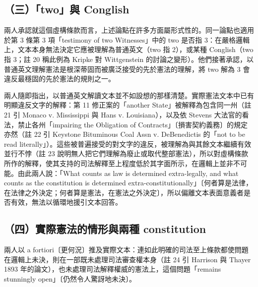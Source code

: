 \subsection{（三）「two」與 Conglish}

兩人承認就這個虛構條款而言，上述論點在許多方面屬形式性的。同一論點也適用於第 3 條第 3 項「testimony of two Witnesses」中的 two 是否指 3：在嚴格邏輯上，文本本身無法決定它應被理解為普通英文（two 指 2），或某種 Conglish（two 指 3；註 20 稱此例為 Kripke 對 Wittgenstein 的討論之變形）。他們接著承認，以普通英文理解憲法是根深蒂固而被廣泛接受的先於憲法的理解，將 two 解為 3 會違反最穩固的先於憲法的規則之一。

兩人隨即指出，以普通英文解讀文本並不如設想的那樣清楚。實際憲法文本中已有明顯違反文字的解釋：第 11 修正案的「another State」被解釋為包含同一州（註 21 引 Monaco v. Mississippi 與 Hans v. Louisiana），以及依 Stevens 大法官的看法，禁止各州「impairing the Obligation of Contracts」〔損害契約義務〕的規定亦然（註 22 引 Keystone Bituminous Coal Ass\textquotesingle n v. DeBenedictis 的「not to be read literally」）。這些被普遍接受的對文字的違反，被理解為與其餘文本繼續有效並行不悖（註 23 說明無人把它們理解為廢止或取代整部憲法），所以對虛構條款所作的解釋，使其支持的司法解釋至上程度低於其字面所示，在邏輯上並非不可能。由此兩人說：「What counts as law is determined extra-legally, and what counts as the constitution is determined extra-constitutionally」〔何者算是法律，在法律之外決定；何者算是憲法，在憲法之外決定〕，所以偏離文本表面意義者是否有效，無法以循環地援引文本回答。

\subsection{（四）實際憲法的情形與兩種 constitution}

兩人以 a fortiori〔更何況〕推及實際文本：連如此明確的司法至上條款都使問題在邏輯上未決，則在一部既未處理司法審查權本身（註 24 引 Harrison 與 Thayer 1893 年的論文），也未處理司法解釋權威的憲法上，這個問題「remains stunningly open」〔仍然令人驚訝地未決〕。

